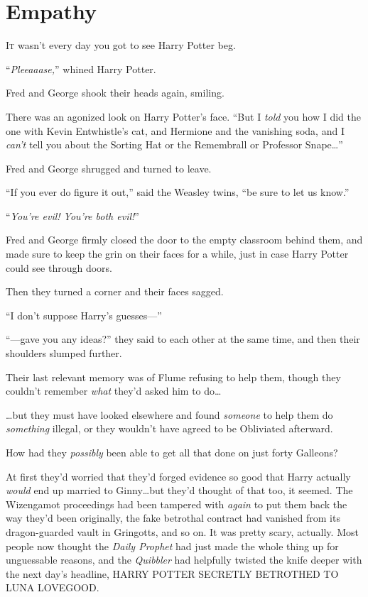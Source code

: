 \chapter{Empathy}

\lettrine{I}{t} wasn’t every day you got to see Harry Potter beg.

\quad\quad
“\emph{Pleeaaase,}” whined Harry Potter.

Fred and George shook their heads again, smiling.

There was an agonized look on Harry Potter’s face. “But I \emph{told} you how I
did the one with Kevin Entwhistle’s cat, and Hermione and the vanishing soda,
and I \emph{can’t} tell you about the Sorting Hat or the Remembrall or
Professor Snape…”

Fred and George shrugged and turned to leave.

“If you ever do figure it out,” said the Weasley twins, “be sure to let us
know.”

“\emph{You’re evil! You’re both evil!}”

Fred and George firmly closed the door to the empty classroom behind them, and
made sure to keep the grin on their faces for a while, just in case Harry
Potter could see through doors.

Then they turned a corner and their faces sagged.

“I don’t suppose Harry’s guesses—”

“—gave you any ideas?” they said to each other at the same time, and then
their shoulders slumped further.

Their last relevant memory was of Flume refusing to help them, though they
couldn’t remember \emph{what} they’d asked him to do…

…but they must have looked elsewhere and found \emph{someone} to help
them do \emph{something} illegal, or they wouldn’t have agreed to be Obliviated
afterward.

How had they \emph{possibly} been able to get all that done on just forty
Galleons?

At first they’d worried that they’d forged evidence so good that Harry actually
\emph{would} end up married to Ginny…but they’d thought of that too, it
seemed. The Wizengamot proceedings had been tampered with \emph{again} to put
them back the way they’d been originally, the fake betrothal contract had
vanished from its dragon-guarded vault in Gringotts, and so on. It was pretty
scary, actually. Most people now thought the \emph{Daily Prophet} had just made
the whole thing up for unguessable reasons, and the \emph{Quibbler} had
helpfully twisted the knife deeper with the next day’s headline, HARRY POTTER
SECRETLY BETROTHED TO LUNA LOVEGOOD.

